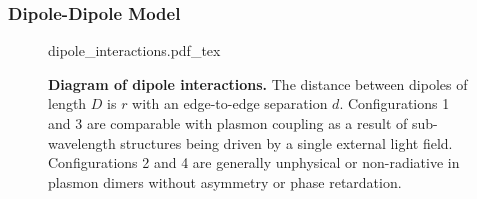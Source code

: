 \documentclass{article}
\begin{document}
\subsubsection{Dipole-Dipole Model}

\begin{figure}[bt]
\fontsize{10pt}{1em}\selectfont
\def\svgwidth{0.7\textwidth}
{dipole_interactions.pdf_tex}
\caption[Diagram of dipole interactions]{\textbf{Diagram of dipole interactions.} The distance between dipoles of length $D$ is $r$ with an edge-to-edge separation $d$. Configurations 1 and 3 are comparable with plasmon coupling as a result of sub-wavelength structures being driven by a single external light field. Configurations 2 and 4 are generally unphysical or non-radiative in plasmon dimers without asymmetry or phase retardation.}
\label{fig:dipole_interactions}
\end{figure}
\end{document}

